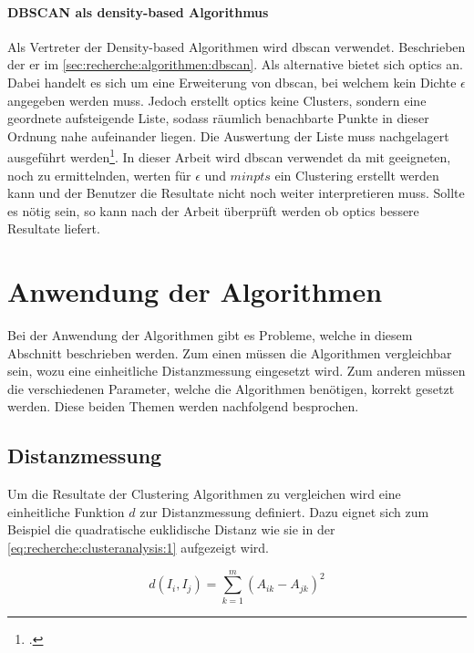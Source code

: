 \paragraph{DBSCAN als density-based Algorithmus}
\label{sec:konzept:algorithmenauswahl:clustering:dbscan}
Als Vertreter der Density-based Algorithmen wird \gls{dbscan} verwendet. Beschrieben der er im \cref{sec:recherche:algorithmen:dbscan}. Als alternative bietet sich \gls{optics} an. Dabei handelt es sich um eine Erweiterung von \gls{dbscan}, bei welchem kein Dichte $\epsilon$ angegeben werden muss. Jedoch erstellt \gls{optics} keine Clusters, sondern eine geordnete aufsteigende Liste, sodass räumlich benachbarte Punkte in dieser Ordnung nahe aufeinander liegen. Die Auswertung der Liste muss nachgelagert ausgeführt werden\footcite{data_mining_concepts_and_techniques}. In dieser Arbeit wird \gls{dbscan} verwendet da mit geeigneten, noch zu ermittelnden, werten für $\epsilon$ und $minpts$ ein Clustering erstellt werden kann und der Benutzer die Resultate nicht noch weiter interpretieren muss. Sollte es nötig sein, so kann nach der Arbeit überprüft werden ob \gls{optics} bessere Resultate liefert.

\section{Anwendung der Algorithmen}
Bei der Anwendung der Algorithmen gibt es Probleme, welche in diesem Abschnitt beschrieben werden. Zum einen müssen die Algorithmen vergleichbar sein, wozu eine einheitliche Distanzmessung eingesetzt wird. Zum anderen müssen die verschiedenen Parameter, welche die Algorithmen benötigen, korrekt gesetzt werden. Diese beiden Themen werden nachfolgend besprochen.

\subsection{Distanzmessung}
\label{sec:konzept:algorithmenauswahl:clustering:distanzmessung}
Um die Resultate der Clustering Algorithmen zu vergleichen wird eine einheitliche Funktion $d$ zur Distanzmessung definiert.
Dazu eignet sich zum Beispiel die quadratische euklidische Distanz wie sie in der \cref{eq:recherche:clusteranalysis:1} aufgezeigt wird.

\begin{equation} \label{eq:recherche:clusteranalysis:1}
d(I_i, I_j) = \sum_{k=1}^{m} (A_{ik} - A_{jk})^2
\end{equation}

